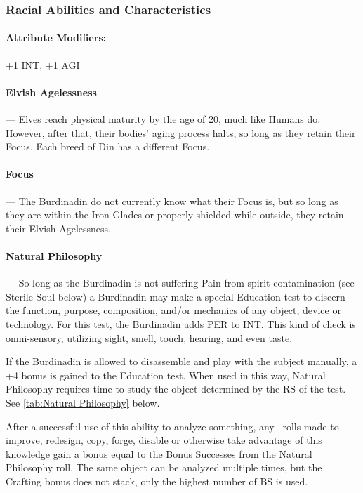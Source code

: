 \documentclass[oneside,11pt,english]{book}
\begin{document}
\subsubsection*{Racial Abilities and Characteristics} 
\paragraph{Attribute Modifiers:} +1 INT, +1 AGI 

\paragraph{Elvish Agelessness}---\quad
Elves reach physical maturity by the age of 20, much like Humans do. However, after that, their 
bodies' aging process halts, so long as they retain their Focus. Each breed of Din has a different Focus. 

\paragraph{Focus}---\quad
The Burdinadin do not currently know what their Focus is, but so long as they are within the Iron 
Glades or properly shielded while outside, they retain their Elvish Agelessness. 

\paragraph{Natural Philosophy}---\quad
So long as the Burdinadin is not suffering Pain from spirit contamination (see Sterile Soul below) 
a Burdinadin may make a special Education test to discern the function, purpose, composition, 
and/or mechanics of any object, device or technology. For this test, the Burdinadin adds PER to 
INT. This kind of check is omni-sensory, utilizing sight, smell, touch, hearing, and even taste.

If the Burdinadin is allowed to disassemble and play with the subject manually, a +4 bonus is gained to the Education test. %
When used in this way, Natural Philosophy requires time to study the object determined by the RS of the test. See \autoref{tab:Natural Philosophy} below.

After a successful use of this ability to analyze something, any ~rolls made to improve, redesign, copy, forge, disable or otherwise take advantage of this knowledge gain a bonus equal 
to the Bonus Successes from the Natural Philosophy roll. The same object can be analyzed 
multiple times, but the Crafting bonus does not stack, only the highest number of BS is used. 
\end{document}
